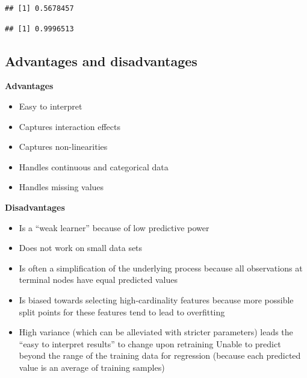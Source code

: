 \documentclass[openany]{book}
\newenvironment{Shaded}{\begin{snugshade}}{\end{snugshade}}
\newcommand{\KeywordTok}[1]{\textcolor[rgb]{0.13,0.29,0.53}{\textbf{#1}}}
\newcommand{\NormalTok}[1]{#1}
\newcommand{\OperatorTok}[1]{\textcolor[rgb]{0.81,0.36,0.00}{\textbf{#1}}}
\providecommand{\tightlist}{%
  \setlength{\itemsep}{0pt}\setlength{\parskip}{0pt}}
\begin{document}
\begin{verbatim}
## [1] 0.5678457
\end{verbatim}

\begin{Shaded}
\end{Shaded}

\begin{verbatim}
## [1] 0.9996513
\end{verbatim}

\hypertarget{advantages-and-disadvantages-2}{%
\subsection{Advantages and disadvantages}\label{advantages-and-disadvantages-2}}

\textbf{Advantages}

\begin{itemize}
\tightlist
\item
  Easy to interpret
\item
  Captures interaction effects
\item
  Captures non-linearities
\item
  Handles continuous and categorical data
\item
  Handles missing values
\end{itemize}

\textbf{Disadvantages}

\begin{itemize}
\tightlist
\item
  Is a ``weak learner'' because of low predictive power
\item
  Does not work on small data sets
\item
  Is often a simplification of the underlying process because all observations at terminal nodes have equal predicted values
\item
  Is biased towards selecting high-cardinality features because more possible split points for these features tend to lead to overfitting
\item
  High variance (which can be alleviated with stricter parameters) leads the ``easy to interpret results'' to change upon retraining
  Unable to predict beyond the range of the training data for regression (because each predicted value is an average of training samples)
\end{itemize}
\end{document}
